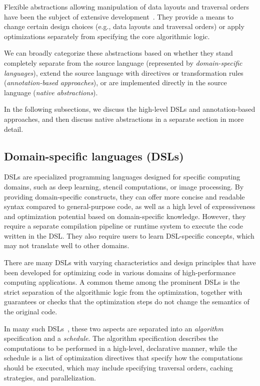 Flexible abstractions allowing manipulation of data layouts and traversal orders have been the subject of extensive development~\cite{ragan2013halide,trott2022mdspan,trott2021kokkos,beckingsale2019raja}. They provide a means to change certain design choices (e.g., data layouts and traversal orders) or apply optimizations separately from specifying the core algorithmic logic.

We can broadly categorize these abstractions based on whether they stand completely separate from the source language (represented by \emph{domain-specific languages}), extend the source language with directives or transformation rules (\emph{annotation-based approaches}), or are implemented directly in the source language (\emph{native abstractions}).

In the following subsections, we discuss the high-level DSLs and annotation-based approaches, and then discuss native abstractions in a separate section in more detail.


\subsection{Domain-specific languages (DSLs)}\label{sec:dsl}

DSLs are specialized programming languages designed for specific computing domains, such as deep learning, stencil computations, or image processing. By providing domain-specific constructs, they can offer more concise and readable syntax compared to general-purpose \cpp code, as well as a high level of expressiveness and optimization potential based on domain-specific knowledge. However, they require a separate compilation pipeline or runtime system to execute the code written in the DSL\@. They also require users to learn DSL-specific concepts, which may not translate well to other domains.

There are many DSLs with varying characteristics and design principles that have been developed for optimizing code in various domains of high-performance computing applications. A common theme among the prominent DSLs is the strict separation of the algorithmic logic from the optimization, together with guarantees or checks that the optimization steps do not change the semantics of the original code.

In many such DSLs~\cite{ragan2013halide,baghdadi2019tiramisu,chen2018tvm,zhang2018graphit}, these two aspects are separated into an \textit{algorithm} specification and a \textit{schedule}. The algorithm specification describes the computations to be performed in a high-level, declarative manner, while the schedule is a list of optimization directives that specify how the computations should be executed, which may include specifying traversal orders, caching strategies, and parallelization.

